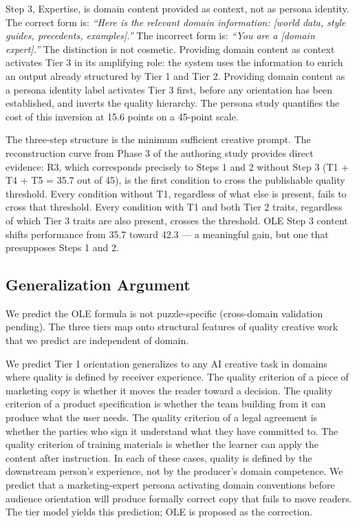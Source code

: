 Step 3, Expertise, is domain content provided as context, not as persona identity. The
correct form is: \textit{``Here is the relevant domain information: [world data, style
guides, precedents, examples].''} The incorrect form is: \textit{``You are a [domain
expert].''} The distinction is not cosmetic. Providing domain content as context
activates Tier 3 in its amplifying role: the system uses the information to enrich an
output already structured by Tier 1 and Tier 2. Providing domain content as a persona
identity label activates Tier 3 first, before any orientation has been established, and
inverts the quality hierarchy. The persona study quantifies the cost of this inversion at
15.6 points on a 45-point scale.

The three-step structure is the minimum sufficient creative prompt. The reconstruction
curve from Phase 3 of the authoring study \cite{paper6} provides direct evidence: R3,
which corresponds precisely to Steps 1 and 2 without Step 3 (T1 + T4 + T5 = 35.7 out of
45), is the first condition to cross the publishable quality threshold. Every condition
without T1, regardless of what else is present, fails to cross that threshold. Every
condition with T1 and both Tier 2 traits, regardless of which Tier 3 traits are also
present, crosses the threshold. OLE Step 3 content shifts performance from 35.7 toward
42.3 --- a meaningful gain, but one that presupposes Steps 1 and 2.

\subsection{Generalization Argument}

We predict the OLE formula is not puzzle-specific (cross-domain validation pending).
The three tiers map onto structural features of quality creative work that we predict
are independent of domain.

We predict Tier 1 orientation generalizes to any AI creative task in domains where quality
is defined by receiver experience. The quality criterion of a piece of marketing copy is
whether it moves the reader toward a decision. The quality criterion of a product
specification is whether the team building from it can produce what the user needs. The
quality criterion of a legal agreement is whether the parties who sign it understand what
they have committed to. The quality criterion of training materials is whether the learner
can apply the content after instruction. In each of these cases, quality is defined by
the downstream person's experience, not by the producer's domain competence. We predict
that a marketing-expert persona activating domain conventions before audience orientation
will produce formally correct copy that fails to move readers. The tier model yields this
prediction; OLE is proposed as the correction.

